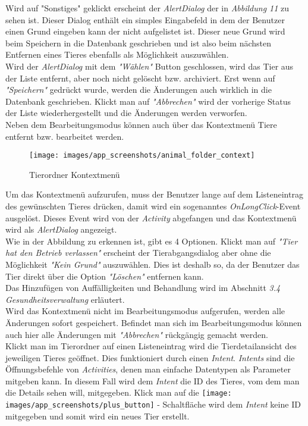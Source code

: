 Wird auf "Sonstiges" geklickt erscheint der \textit{AlertDialog} der in \textit{Abbildung 11} zu sehen ist. Dieser Dialog enthält ein simples Eingabefeld in dem der Benutzer einen Grund eingeben kann der nicht aufgelistet ist. Dieser neue Grund wird beim Speichern in die Datenbank geschrieben und ist also beim nächsten Entfernen eines Tieres ebenfalls als Möglichkeit auszuwählen. \\
Wird der \textit{AlertDialog} mit dem \textit{"Wählen"} Button geschlossen, wird das Tier aus der Liste entfernt, aber noch nicht gelöscht bzw. archiviert. Erst wenn auf \textit{"Speichern"} gedrückt wurde, werden die Änderungen auch wirklich in die Datenbank geschrieben. Klickt man auf \textit{"Abbrechen"} wird der vorherige Status der Liste wiederhergestellt und die Änderungen werden verworfen. \\[0.5em]
Neben dem Bearbeitungsmodus können auch über das Kontextmenü Tiere entfernt bzw. bearbeitet werden.
\begin{figure}[H]
\centering
\texttt{[image: images/app\_screenshots/animal\_folder\_context]}
\caption{Tierordner Kontextmenü}
\end{figure}
Um das Kontextmenü aufzurufen, muss der Benutzer lange auf dem Listeneintrag des gewünschten Tieres drücken, damit wird ein sogenanntes \textit{OnLongClick}-Event ausgelöst. Dieses Event wird von der \textit{Activity} abgefangen und das Kontextmenü wird als \textit{AlertDialog} angezeigt.\\
Wie in der Abbildung zu erkennen ist, gibt es 4 Optionen. 
Klickt man auf \textit{"Tier hat den Betrieb verlassen"} erscheint der Tierabgangsdialog aber ohne die Möglichkeit \textit{"Kein Grund"} auszuwählen. Dies ist deshalb so, da der Benutzer das Tier direkt über die Option \textit{"Löschen"} entfernen kann.\\
Das Hinzufügen von Auffälligkeiten und Behandlung wird im Abschnitt \textit{3.4 Gesundheitsverwaltung} erläutert.\\
Wird das Kontextmenü nicht im Bearbeitungsmodus aufgerufen, werden alle Änderungen sofort gespeichert. Befindet man sich im Bearbeitungsmodus können auch hier alle Änderungen mit \textit{"Abbrechen"} rückgängig gemacht werden. \\[0.5em]
Klickt man im Tierordner auf einen Listeneintrag wird die Tierdetailansicht des jeweiligen Tieres geöffnet. Dies funktioniert durch einen \textit{Intent}. \textit{Intents} sind die Öffnungsbefehle von \textit{Activities}, denen man einfache Datentypen als Parameter mitgeben kann. In diesem Fall wird dem \textit{Intent} die ID des Tieres, vom dem man die Details sehen will, mitgegeben. Klick man auf die \texttt{[image: images/app\_screenshots/plus\_button]} - Schaltfläche wird dem \textit{Intent} keine ID mitgegeben und somit wird ein neues Tier erstellt.
